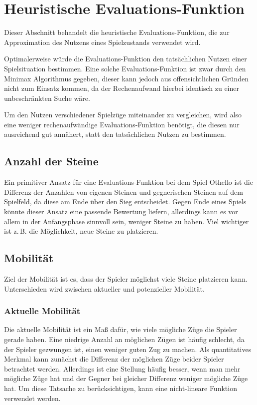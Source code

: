 \section{Heuristische Evaluations-Funktion}
\label{sec:heuristic}
Dieser Abschnitt behandelt die heuristische Evaluations-Funktion, die zur Approximation des Nutzens eines Spielzustands
verwendet wird.

Optimalerweise würde die Evaluations-Funktion den tatsächlichen Nutzen einer Spielsituation bestimmen. Eine solche
Evaluations-Funktion ist zwar durch den Minimax Algorithmus gegeben, dieser kann jedoch aus offensichtlichen Gründen
nicht zum Einsatz kommen, da der Rechenaufwand hierbei identisch zu einer unbeschränkten Suche wäre.

Um den Nutzen verschiedener Spielzüge miteinander zu vergleichen, wird also eine weniger rechenaufwändige
Evaluations-Funktion benötigt, die diesen nur ausreichend gut annähert, statt den tatsächlichen Nutzen zu bestimmen.

\subsection{Anzahl der Steine}
Ein primitiver Ansatz für eine Evaluations-Funktion bei dem Spiel Othello ist die Differenz der Anzahlen von eigenen
Steinen und gegnerischen Steinen auf dem Spielfeld, da diese am Ende über den Sieg entscheidet. Gegen Ende eines Spiels
könnte dieser Ansatz eine passende Bewertung liefern, allerdings kann es vor allem in der Anfangsphase sinnvoll sein,
weniger Steine zu haben. Viel wichtiger ist z.\,B. die Möglichkeit, neue Steine zu platzieren.

\subsection{Mobilität}
Ziel der Mobilität ist es, dass der Spieler möglichst viele Steine platzieren kann. Unterschieden wird zwischen
aktueller und potenzieller Mobilität.

\subsubsection{Aktuelle Mobilität}
Die aktuelle Mobilität ist ein Maß dafür, wie viele mögliche Züge die Spieler gerade haben. Eine niedrige Anzahl an
möglichen Zügen ist häufig schlecht, da der Spieler gezwungen ist, einen weniger guten Zug zu machen. Als quantitatives
Merkmal kann zunächst die Differenz der möglichen Züge beider Spieler betrachtet werden. Allerdings ist eine Stellung
häufig besser, wenn man mehr mögliche Züge hat und der Gegner bei gleicher Differenz weniger mögliche Züge hat. Um diese
Tatsache zu berücksichtigen, kann eine nicht-lineare Funktion verwendet werden.
\cite[S. 7]{evaluationfunctions}

